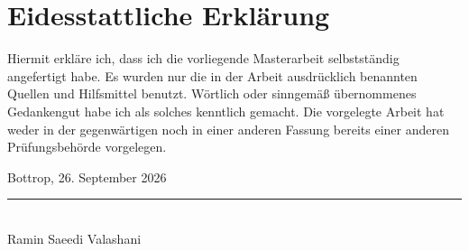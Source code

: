 \chapter*{Eidesstattliche Erklärung}

Hiermit erkläre ich, dass ich die vorliegende Masterarbeit selbstständig angefertigt habe. Es wurden nur die in der Arbeit ausdrücklich benannten Quellen und Hilfsmittel benutzt. Wörtlich oder sinngemäß übernommenes Gedankengut habe ich als solches kenntlich gemacht. Die vorgelegte Arbeit hat weder in der gegenwärtigen noch in einer anderen Fassung bereits einer anderen Prüfungsbehörde vorgelegen.

\vspace{1.2cm}
\noindent Bottrop, 26. September 2026 \hfill \rule{6cm}{0.4pt}\\[-1mm]
\hfill Ramin Saeedi Valashani


